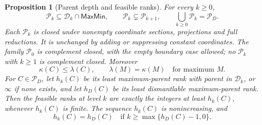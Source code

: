 \documentclass[11pt]{article}
\newtheorem{proposition}{Proposition}[section]
\theoremstyle{definition}
\newcommand{\MaxMin}{\mathsf{MaxMin}}
\begin{document}
\begin{proposition}[Parent depth and feasible ranks]
\label{prop:parent-depth-hierarchy}
For every $k\ge0$,
\[
 \mathcal P_k\subseteq\mathcal D_k\cap\MaxMin,\qquad
 \mathcal P_k\subsetneq\mathcal P_{k+1},\qquad
 \bigcup_{k\ge0}\mathcal P_k=\mathcal P_D.
\]
Each $\mathcal P_k$ is closed under nonempty coordinate sections,
projections and full reductions. It is unchanged by adding or suppressing
constant coordinates. The family $\mathcal P_0$ is complement closed,
with the empty boundary case allowed; no $\mathcal P_k$ with $k\ge1$
is complement closed. Moreover
\[
 \kappa(C)\le\lambda(C),
 \qquad \lambda(M)=\kappa(M)\quad\text{for maximum }M.
\]
For $C\in\mathcal P_D$, let $h_k(C)$ be its least maximum-parent rank
with parent in $\mathcal D_k$, or $\infty$ if none exists, and let
$h_D(C)$ be its least dismantlable maximum-parent rank. Then the feasible
ranks at level $k$ are exactly the integers at least $h_k(C)$, whenever
$h_k(C)$ is finite. The sequence $h_k(C)$ is nonincreasing, and
\[
 h_k(C)=h_D(C)\quad\text{if }k\ge\max\{h_D(C)-1,0\}.
\]
\end{proposition}
\end{document}
